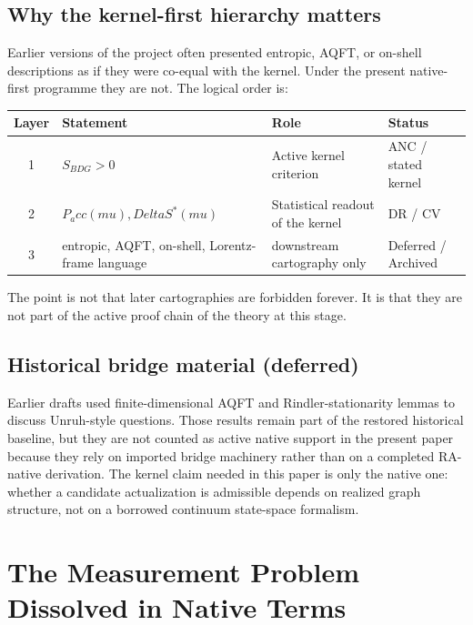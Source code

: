 \documentclass[11pt]{article}
\def\Delta{Delta}%
\def\mu{mu}%
\def\mathrm#1{#1}%
\def\Pacc{P_acc}%
\newcommand{\Pacc}{P_{\mathrm{acc}}}
\begin{document}
\subsection{Why the kernel-first hierarchy matters}

Earlier versions of the project often presented entropic, AQFT, or on-shell descriptions as if they were co-equal with the kernel. Under the present native-first programme they are not. The logical order is:
\begin{center}
\begin{tabular}{clll}
\toprule
Layer & Statement & Role & Status \\
\midrule
1 & $S_{\mathrm{BDG}} > 0$ & Active kernel criterion & ANC / stated kernel \\
2 & $\Pacc(\mu), \Delta S^*(\mu)$ & Statistical readout of the kernel & DR / CV \\
3 & entropic, AQFT, on-shell, Lorentz-frame language & downstream cartography only & Deferred / Archived \\
\bottomrule
\end{tabular}
\end{center}

The point is not that later cartographies are forbidden forever. It is that they are not part of the active proof chain of the theory at this stage.

\subsection{Historical bridge material (deferred)}

Earlier drafts used finite-dimensional AQFT and Rindler-stationarity lemmas to discuss Unruh-style questions. Those results remain part of the restored historical baseline, but they are not counted as active native support in the present paper because they rely on imported bridge machinery rather than on a completed RA-native derivation. The kernel claim needed in this paper is only the native one: whether a candidate actualization is admissible depends on realized graph structure, not on a borrowed continuum state-space formalism.

\section{The Measurement Problem Dissolved in Native Terms}
\label{sec:measurement}
\end{document}
